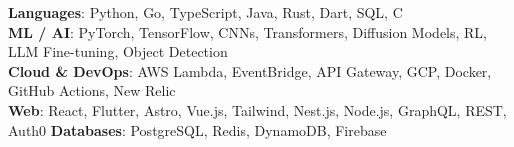 \small
\textbf{Languages}{: Python, Go, TypeScript, Java, Rust, Dart, SQL, C} \\
\textbf{ML / AI}{: PyTorch, TensorFlow, CNNs, Transformers, Diffusion Models, RL, LLM Fine-tuning, Object Detection} \\
\textbf{Cloud \& DevOps}{: AWS Lambda, EventBridge, API Gateway, GCP, Docker, GitHub Actions, New Relic} \\
\textbf{Web}{: React, Flutter, Astro, Vue.js, Tailwind, Nest.js, Node.js, GraphQL, REST, Auth0} \quad \textbf{Databases}{: PostgreSQL, Redis, DynamoDB, Firebase}
